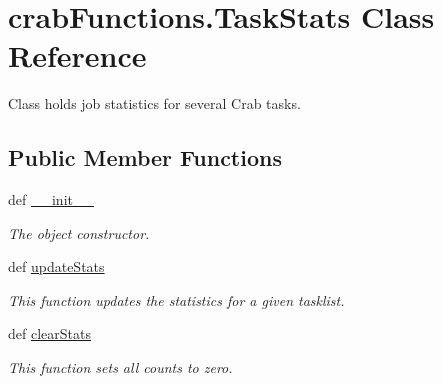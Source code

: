 \section{crab\-Functions.\-Task\-Stats Class Reference}
\label{classcrabFunctions_1_1TaskStats}


Class holds job statistics for several Crab tasks.  


\subsection*{Public Member Functions}
\begin{DoxyCompactItemize}
\item 
def \hyperlink{classcrabFunctions_1_1TaskStats_a0fd9afc314b6a62602e5910b2cc6d4b3}{\-\_\-\-\_\-init\-\_\-\-\_\-}
\begin{DoxyCompactList}\small\item\em The object constructor. \end{DoxyCompactList}\item 
def \hyperlink{classcrabFunctions_1_1TaskStats_a3e6e4b04165d768b8d5981acd4afcef6}{update\-Stats}
\begin{DoxyCompactList}\small\item\em This function updates the statistics for a given tasklist. \end{DoxyCompactList}\item 
def \hyperlink{classcrabFunctions_1_1TaskStats_a4ab167eb6ea8c2ead89bcf45a5a555aa}{clear\-Stats}
\begin{DoxyCompactList}\small\item\em This function sets all counts to zero. \end{DoxyCompactList}\end{DoxyCompactItemize}
